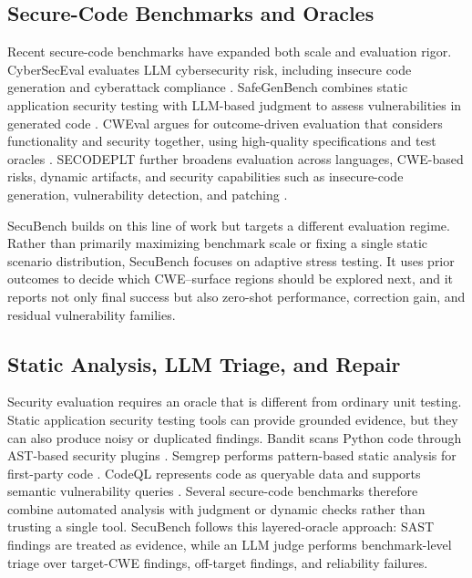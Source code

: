 \documentclass[11pt]{article}
\newcommand{\toolname}{SecuBench}
\begin{document}
\subsection{Secure-Code Benchmarks and Oracles}

Recent secure-code benchmarks have expanded both scale and evaluation rigor. CyberSecEval evaluates LLM cybersecurity risk, including insecure code generation and cyberattack compliance \cite{bhatt2023cyberseceval}. SafeGenBench combines static application security testing with LLM-based judgment to assess vulnerabilities in generated code \cite{li2025safegenbench}. CWEval argues for outcome-driven evaluation that considers functionality and security together, using high-quality specifications and test oracles \cite{peng2025cweval}. SECODEPLT further broadens evaluation across languages, CWE-based risks, dynamic artifacts, and security capabilities such as insecure-code generation, vulnerability detection, and patching \cite{nie2025secodeplt}.

\toolname{} builds on this line of work but targets a different evaluation regime. Rather than primarily maximizing benchmark scale or fixing a single static scenario distribution, \toolname{} focuses on adaptive stress testing. It uses prior outcomes to decide which CWE--surface regions should be explored next, and it reports not only final success but also zero-shot performance, correction gain, and residual vulnerability families.

\subsection{Static Analysis, LLM Triage, and Repair}

Security evaluation requires an oracle that is different from ordinary unit testing. Static application security testing tools can provide grounded evidence, but they can also produce noisy or duplicated findings. Bandit scans Python code through AST-based security plugins \cite{bandit}. Semgrep performs pattern-based static analysis for first-party code \cite{semgrep}. CodeQL represents code as queryable data and supports semantic vulnerability queries \cite{codeql}. Several secure-code benchmarks therefore combine automated analysis with judgment or dynamic checks rather than trusting a single tool. \toolname{} follows this layered-oracle approach: SAST findings are treated as evidence, while an LLM judge performs benchmark-level triage over target-CWE findings, off-target findings, and reliability failures.
\end{document}
